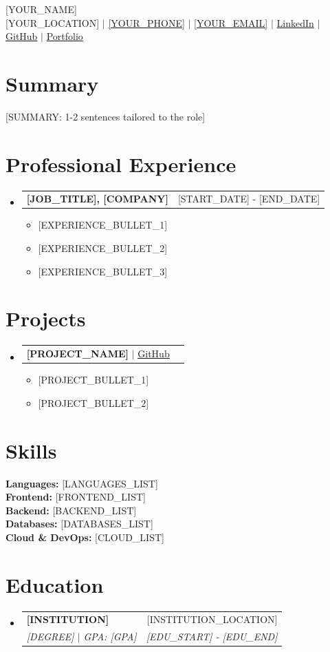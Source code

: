 \documentclass[letterpaper,11pt]{article}
\makeatletter
\newcommand{\resumeItem}[1]{
  \item\small{#1 \vspace{-2pt}}
}
\newcommand{\resumeSubheading}[4]{
  \vspace{1pt}\item
    \begin{tabular*}{0.97\textwidth}[t]{l@{\extracolsep{\fill}}r}
      \textbf{#1} & #2 \\
      \textit{\small#3} & \textit{\small #4} \\
    \end{tabular*}\vspace{-6pt}
}
\newcommand{\resumeProjectHeading}[2]{
    \vspace{1pt}\item
    \begin{tabular*}{0.97\textwidth}{l@{\extracolsep{\fill}}r}
      \small#1 & #2 \\
    \end{tabular*}\vspace{-6pt}
}
\newcommand{\resumeSubheadingSingle}[2]{
  \vspace{1pt}\item
    \begin{tabular*}{0.97\textwidth}[t]{l@{\extracolsep{\fill}}r}
      \textbf{#1} & #2 \\
    \end{tabular*}\vspace{-6pt}
}
\newcommand{\resumeSubHeadingListStart}{\begin{itemize}[leftmargin=0.15in, label={}]}
\newcommand{\resumeSubHeadingListEnd}{\end{itemize}}
\newcommand{\resumeItemListStart}{\begin{itemize}[leftmargin=0.3in, label=\textbullet]}
\newcommand{\resumeItemListEnd}{\end{itemize}\vspace{-5pt}}
\makeatother
\begin{document}
\begin{center}
    {\Huge \scshape [YOUR_NAME]} \\ \vspace{3pt}
    \small
    [YOUR_LOCATION] $|$
    \href{tel:[YOUR_PHONE_DIGITS]}{[YOUR_PHONE]} $|$
    \href{mailto:[YOUR_EMAIL]}{[YOUR_EMAIL]} $|$
    \href{[YOUR_LINKEDIN_URL]}{LinkedIn} $|$
    \href{[YOUR_GITHUB_URL]}{GitHub} $|$
    \href{[YOUR_PORTFOLIO_URL]}{Portfolio}
\end{center}

\section{Summary}
\small{[SUMMARY: 1-2 sentences tailored to the role]}

\section{Professional Experience}
  \resumeSubHeadingListStart

    \resumeSubheadingSingle
      {[JOB_TITLE], [COMPANY]}{[START_DATE] - [END_DATE]}
      \resumeItemListStart
        \resumeItem{[EXPERIENCE_BULLET_1]}
        \resumeItem{[EXPERIENCE_BULLET_2]}
        \resumeItem{[EXPERIENCE_BULLET_3]}
      \resumeItemListEnd


  \resumeSubHeadingListEnd

\section{Projects}
    \resumeSubHeadingListStart

      \resumeProjectHeading
          {\textbf{[PROJECT_NAME]} $|$ \href{[PROJECT_URL]}{\underline{GitHub}}}{}
          \resumeItemListStart
            \resumeItem{[PROJECT_BULLET_1]}
            \resumeItem{[PROJECT_BULLET_2]}
          \resumeItemListEnd


    \resumeSubHeadingListEnd

\section{Skills}
 \begin{itemize}[leftmargin=0.15in, label={}]
    \small{\item{
     \textbf{Languages:} [LANGUAGES_LIST] \\
     \textbf{Frontend:} [FRONTEND_LIST] \\
     \textbf{Backend:} [BACKEND_LIST] \\
     \textbf{Databases:} [DATABASES_LIST] \\
     \textbf{Cloud \& DevOps:} [CLOUD_LIST]
    }}
 \end{itemize}

\section{Education}
  \resumeSubHeadingListStart
    \resumeSubheading
      {[INSTITUTION]}{[INSTITUTION_LOCATION]}
      {[DEGREE] $|$ GPA: [GPA]}{[EDU_START] - [EDU_END]}
  \resumeSubHeadingListEnd
\end{document}
